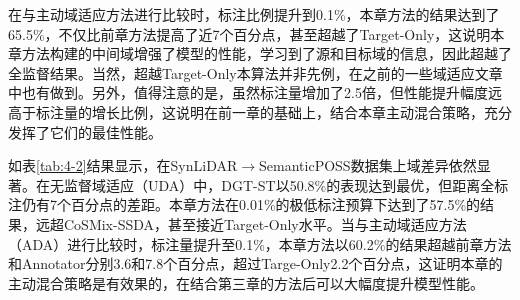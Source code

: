     在与主动域适应方法进行比较时，标注比例提升到0.1\%，本章方法的结果达到了65.5\%，不仅比前章方法提高了近7个百分点，甚至超越了Target-Only，这说明本章方法构建的中间域增强了模型的性能，学习到了源和目标域的信息，因此超越了全监督结果。当然，超越Target-Only本算法并非先例，在之前的一些域适应文章中也有做到。另外，值得注意的是，虽然标注量增加了2.5倍，但性能提升幅度远高于标注量的增长比例，这说明在前一章的基础上，结合本章主动混合策略，充分发挥了它们的最佳性能。
    
    
    如表\ref{tab:4-2}结果显示，在SynLiDAR$\to$SemanticPOSS数据集上域差异依然显著。在无监督域适应（UDA）中，DGT-ST以50.8\%的表现达到最优，但距离全标注仍有7个百分点的差距。本章方法在0.01\%的极低标注预算下达到了57.5\%的结果，远超CoSMix-SSDA，甚至接近Target-Only水平。当与主动域适应方法（ADA）进行比较时，标注量提升至0.1\%，本章方法以60.2\%的结果超越前章方法和Annotator分别3.6和7.8个百分点，超过Targe-Only2.2个百分点，这证明本章的主动混合策略是有效果的，在结合第三章的方法后可以大幅度提升模型性能。

